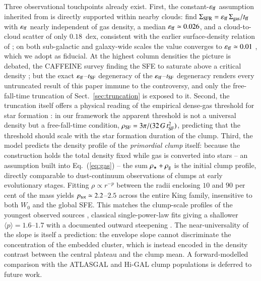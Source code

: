 \documentclass{aa}
\newcommand{\tsf}{t_{\rm SF}}
\newcommand{\tff}{t_{\rm ff}}
\newcommand{\effE}{\varepsilon_{\rm ff}}
\begin{document}
Three observational touchpoints already exist. First, the constant-$\effE$
assumption inherited from \citet{Parmentier2013} is directly supported
within nearby clouds: \citet{Pokhrel2021} find
$\Sigma_{\rm SFR}=\effE\,\Sigma_{\rm gas}/\tff$ with $\effE$ nearly
independent of gas density, a median $\effE\simeq0.026$, and a
cloud-to-cloud scatter of only $0.18$~dex, consistent with the earlier
surface-density relation of \citet{Gutermuth2011}; on both sub-galactic and
galaxy-wide scales the value converges to $\effE\simeq0.01$
\citep{KrumholzMcKeeBlandHawthorn2019,Utomo2018}, which we adopt as
fiducial. At the highest column densities the picture is debated, the
CAFFEINE survey finding the SFE to saturate above a critical density
\citep{Mattern2024}; but the exact $\effE$--$\tsf$ degeneracy of
the $\effE$--$\tsf$ degeneracy renders every untruncated result of this
paper immune to the controversy, and only the free-fall-time truncation of
Sect.~\ref{sec:truncation} is exposed to it. Second, the truncation
itself offers a physical reading of the
empirical dense-gas threshold for star formation
\citep{Lada2010,Lada2012}: in our framework the apparent threshold is
not a universal density but a free-fall-time condition,
$\rho_{\rm SF}=3\pi/(32\,G\,\tsf^2)$, predicting that the threshold
should scale with the star formation duration of the clump. Third, the
model predicts the density profile of the \emph{primordial clump}
itself: because the \citet{Parmentier2013} construction holds the total
density fixed while gas is converted into stars -- an assumption built
into Eq.~(\ref{eq:gas}) -- the sum $\rho_\star+\rho_{\rm g}$ is the
initial clump profile, directly comparable to dust-continuum
observations of clumps at early evolutionary stages. Fitting
$\rho\propto r^{-p}$ between the radii enclosing $10$ and $90$ per cent
of the mass yields $p_{\rm tot}\simeq2.2$--$2.5$ across the entire King
family, insensitive to both $W_0$ and the global SFE. This matches the
clump-scale profiles of the youngest observed sources
\citep[$p\simeq2.2$ at the earliest phases;][]{Gieser2023}, classical
single-power-law fits giving a shallower $\langle p\rangle=1.6$--$1.7$
with a documented outward steepening
\citep{Mueller2002,Beuther2002,Pirogov2009}. The near-universality of
the slope is itself a prediction: the envelope slope cannot discriminate
the concentration of the embedded cluster, which is instead encoded in
the density contrast between the central plateau and the clump mean. A
forward-modelled comparison with the ATLASGAL and Hi-GAL clump
populations \citep{Urquhart2018,Elia2021} is deferred to future work.
\end{document}
